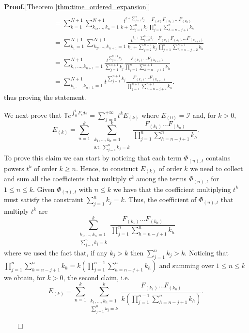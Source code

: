 \documentclass[twocolumn]{autart}    %
\newenvironment{proof}{\textbf{Proof.}}{\hfill $\qed$}
\newcommand{\Ic}{\mathcal{I}}
\newcommand{\Tb}{\mathbb{T}}
\begin{document}
\begin{proof}[Theorem \ref{thm:time_ordered_expansion}]
\begin{align*}
    \end{align*}
    \begin{align*} %
        &= \sum_{k=1}^{N+1} \sum_{k_1,\dots,k_n=1}^{N+1} \frac{t^{k+\sum_{j=1}^n k_j}}{k+\sum_{j=1}^n k_j} \frac{ F_{(k)}F_{(k_1)}\dots F_{(k_n)}}{\prod_{j=1}^n \sum_{h=n-j+1}^n k_h} 
        \\&= \sum_{k_1=1}^{N+1} \sum_{k_2,\dots,k_{n+1}=1}^{N+1} \frac{t^{k_1+\sum_{j=2}^{n+1} k_j}}{k_1+\sum_{j=2}^{n+1} k_j} \frac{F_{(k_1)}F_{(k_2)}\dots F_{(k_{n+1})}}{\prod_{j=1}^{n} \sum_{h=n-j+2}^{n+1} k_h}\\
        &= \sum_{k_1,\dots,k_{n+1}=1}^{N+1} \frac{t^{\sum_{j=1}^{n+1} k_j}}{\sum_{j=1}^{n+1} k_j} \frac{F_{(k_1)}\dots F_{(k_{n+1})}}{\prod_{j=1}^{n} \sum_{h=n-j+2}^{n+1} k_h}
        \\&= \sum_{k_1,\dots,k_{n+1}=1}^{N+1} t^{\sum_{j=1}^{n+1} k_j} \frac{F_{(k_1)}\dots F_{(k_{n+1})}}{\prod_{j=1}^{n+1} \sum_{h=n-j+2}^{n+1} k_h}.
    \end{align*}
    thus proving the statement.

    We next prove that \(\Tb e^{\int_0^t F_s ds} = \sum_{f=0}^{+\infty} t^k E_{(k)}\) where $E_{(0)} = \Ic$ and, for $k>0$,
    \[ E_{(k)} = \sum_{n=1}^k \sum_{\substack{{k_1,\dots,k_{n} = 1}\\{\text{s.t. }\sum_{j=1}^{n}k_{j}=k}}}^{k} \frac{F_{(k_1)}\dots F_{(k_n)} }{\prod_{j=1}^n \sum_{h=n-j+1}^n k_h}. \]
    To prove this claim we can start by noticing that each term $\Phi_{(n),t}$ contains powers $t^k$ of order $k\geq n$. Hence, to construct $E_{(k)}$ of order $k$ we need to collect and sum all the coefficients that multiply $t^k$ among the terms $\Phi_{(n),t}$ for $1\leq n\leq k$. Given $\Phi_{(n),t}$ with $n\leq k$ we have that the coefficient multiplying $t^k$ must satisfy the constraint $\sum_{j=1}^n k_j = k$. 
    Thus, the coefficient of $\Phi_{(n),t}$ that multiply $t^k$ are
    \[%
    \sum_{\substack{{k_1,\dots,k_{n} = 1}\\{\sum_{j=1}^{n}k_{j}=k}}}^{k} \frac{ F_{(k_1)}\dots F_{(k_n)}}{\prod_{j=1}^n \sum_{h=n-j+1}^n k_h}\]
    where we used the fact that, if any $k_j>k$ then $\sum_{j=1}^n k_j>k$.  
    Noticing that $\prod_{j=1}^n \sum_{h=n-j+1}^n k_h = k(\prod_{j=1}^{n-1} \sum_{h=n-j+1}^n k_h)$ and summing over $1\leq n\leq k$ we obtain, for $k>0$, the second claim, i.e.  
    \[E_{(k)} = \sum_{n=1}^{k} \sum_{\substack{{k_1,\dots,k_{n} = 1}\\{\sum_{j=1}^{n}k_{j}=k}}}^{k} \frac{ F_{(k_1)}\dots F_{(k_n)}}{k(\prod_{j=1}^{n-1} \sum_{h=n-j+1}^n k_h)}.\]


\end{proof}
\end{document}
